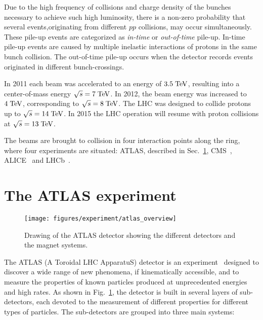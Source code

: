 Due to the high frequency of collisions and charge density of the
bunches necessary to achieve such high luminosity, there is a non-zero
probability that several events,originating from different $pp$ collisions, 
may occur simultaneously.
These pile-up events are categorized as {\it in-time} or {\it
  out-of-time} pile-up. 
In-time pile-up events are caused by  multiple inelastic interactions
of protons in the same bunch collision.
The out-of-time pile-up occurs when the detector records events
originated in different bunch-crossings.

In 2011 each beam was accelerated to an energy of \mbox{$3.5 \; \mathrm{TeV}$}, 
resulting into a center-of-mass energy \mbox{$\sqrt{s} = 7 \; \mathrm{TeV}$}.
In 2012, the beam energy was increased to \mbox{$4 \; \mathrm{TeV}$}, 
corresponding to \mbox{$\sqrt{s} = 8 \; \mathrm{TeV}$}.
The LHC was designed to collide protons up to \mbox{$\sqrt{s} = 14
  \; \mathrm{TeV}$}. In 2015 the LHC operation will resume with proton collisions
at \mbox{$\sqrt{s} = 13 \; \mathrm{TeV}$}. 

The beams are brought to collision in four interaction points along
the ring, where four experiments are situated: 
ATLAS, described in Sec.~\ref{sec:ATLAS}, CMS~\cite{cms}, ALICE~\cite{alice} and LHCb~\cite{lhcb}.

\section{The ATLAS experiment}
\label{sec:ATLAS}

\begin{figure}[ht]
\begin{center}
\texttt{[image: figures/experiment/atlas\_overview]}
\caption[Drawing of the ATLAS detector]{
  Drawing of the ATLAS detector showing the different detectors and
  the magnet systems.}
\label{fig:ATLAS}
\end{center}
\end{figure}

The ATLAS (A Toroidal LHC ApparatuS) detector is an
experiment~\cite{detectorpaper} designed to discover a wide range of
new phenomena, if kinematically accessible, and to measure the
properties of known particles produced at unprecedented energies and
high rates.
As shown in Fig.~\ref{fig:ATLAS}, the detector is built in several
layers of sub-detectors, each devoted to the measurement of different
properties for different types of particles. The sub-detectors are
grouped into three main systems: 

